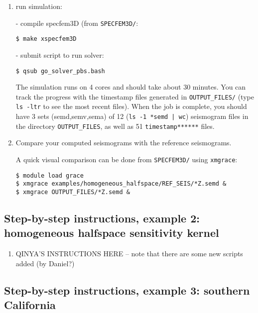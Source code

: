 \documentclass[10pt,fleqn,letterpaper]{article}
\begin{document}
\begin{enumerate}
\item run simulation:

   - compile specfem3D (from \verb+SPECFEM3D/+:
\begin{lstlisting}
$ make xspecfem3D
\end{lstlisting}
   - submit script to run solver:
\begin{lstlisting}
$ qsub go_solver_pbs.bash
\end{lstlisting}

The simulation runs on 4 cores and should take about 30 minutes. You can track the progress with the timestamp files generated in \verb+OUTPUT_FILES/+ (type \verb+ls -ltr+ to see the most recent files). When the job is complete, you should have 3 sets (semd,semv,sema) of 12 (\verb+ls -1 *semd | wc+) seismogram files in the directory \verb+OUTPUT_FILES+, as well as 51 \verb+timestamp******+ files.

\item Compare your computed seismograms with the reference seismograms.

A quick visual comparison can be done from \verb+SPECFEM3D/+ using \verb+xmgrace+:
\begin{lstlisting}
$ module load grace
$ xmgrace examples/homogeneous_halfspace/REF_SEIS/*Z.semd &
$ xmgrace OUTPUT_FILES/*Z.semd &
\end{lstlisting}

\end{enumerate}


\subsection*{Step-by-step instructions, example 2: homogeneous halfspace sensitivity kernel}

\begin{enumerate}
\item QINYA'S INSTRUCTIONS HERE -- note that there are some new scripts added (by Daniel?)
\end{enumerate}


\subsection*{Step-by-step instructions, example 3: southern California}
\end{document}
